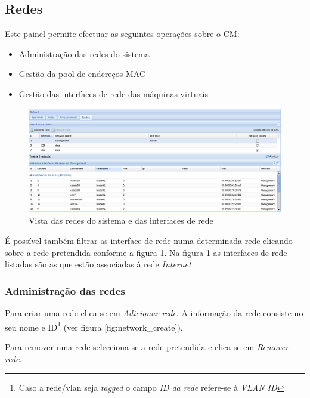 \subsection{Redes}
\label{sub:redes}

Este painel permite efectuar as seguintes operações sobre o CM:

\begin{itemize}
	\item Administração das redes do sistema
	\item Gestão da pool de endereços MAC
	\item Gestão das interfaces de rede das máquinas virtuais 
\end{itemize}

\begin{figure}[H]
	\begin{center}
	\includegraphics[scale=0.45]{screenshots/main_networks.png}
	\caption{Vista das redes do sistema  e das interfaces de rede}
	\label{fig:main_networks}
	\end{center}
\end{figure}

É possível também filtrar as interface de rede numa determinada rede clicando sobre a rede pretendida conforme a figura \ref{fig:main_networks}.
Na figura \ref{fig:main_networks} as interfaces de rede listadas são as que estão associadas à rede \emph{Internet}

\subsubsection{Administração das redes}

Para criar uma rede clica-se em \emph{Adicionar rede}.
A informação da rede consiste no seu nome e ID\footnote{Caso a rede/vlan seja \emph{tagged} o campo \emph{ID da rede} refere-se à \emph{VLAN ID}} (ver figura \ref{fig:network_create}).

Para remover uma rede selecciona-se a rede pretendida e clica-se em \emph{Remover rede}.

